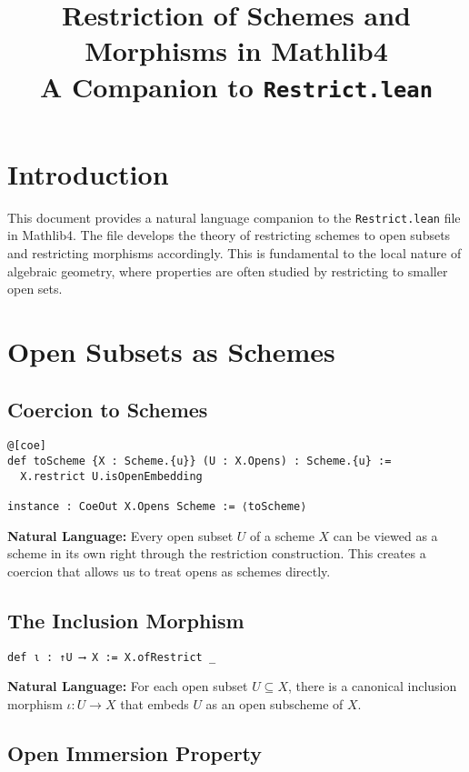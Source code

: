 \documentclass{article}
\title{Restriction of Schemes and Morphisms in Mathlib4\\
\large A Companion to \texttt{Restrict.lean}}
\author{}
\date{}
\theoremstyle{definition}
\begin{document}
\maketitle

\section{Introduction}

This document provides a natural language companion to the \texttt{Restrict.lean} file in Mathlib4. The file develops the theory of restricting schemes to open subsets and restricting morphisms accordingly. This is fundamental to the local nature of algebraic geometry, where properties are often studied by restricting to smaller open sets.

\section{Open Subsets as Schemes}

\subsection{Coercion to Schemes}

\begin{lstlisting}
@[coe]
def toScheme {X : Scheme.{u}} (U : X.Opens) : Scheme.{u} :=
  X.restrict U.isOpenEmbedding

instance : CoeOut X.Opens Scheme := ⟨toScheme⟩
\end{lstlisting}

\textbf{Natural Language:} Every open subset $U$ of a scheme $X$ can be viewed as a scheme in its own right through the restriction construction. This creates a coercion that allows us to treat opens as schemes directly.

\subsection{The Inclusion Morphism}

\begin{lstlisting}
def ι : ↑U ⟶ X := X.ofRestrict _
\end{lstlisting}

\textbf{Natural Language:} For each open subset $U \subseteq X$, there is a canonical inclusion morphism $\iota: U \to X$ that embeds $U$ as an open subscheme of $X$.

\subsection{Open Immersion Property}
\end{document}
